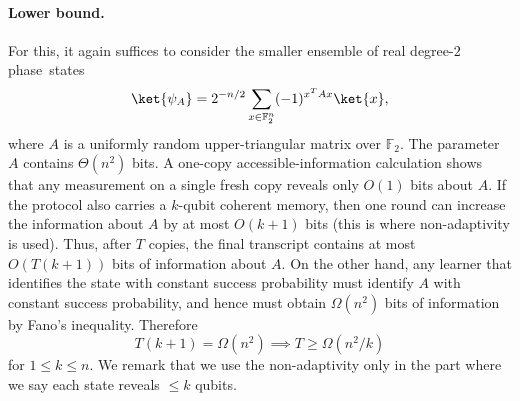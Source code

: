 \documentclass[11pt]{article}
\newcommand{\F}{\mathbb{F}}
\begin{document}
\paragraph{Lower bound.} For this, it again suffices to consider the smaller ensemble of real degree-$2$ phase~states
$$
    \ket{\psi_A}
    =
    2^{-n/2}\sum_{x\in\F_2^n}(-1)^{x^TAx}\ket{x},
$$
where $A$ is a uniformly random upper-triangular matrix over $\F_2$.  The  parameter $A$ contains $\Theta(n^2)$ bits.  A one-copy accessible-information calculation shows that any measurement on a single fresh copy reveals only $O(1)$ bits about $A$.  If the protocol also carries a $k$-qubit coherent memory, then one round can increase the information about $A$ by at most $O(k+1)$ bits (this is where non-adaptivity is used). Thus, after $T$ copies, the final transcript contains at most $O(T(k+1))$ bits of information about $A$.  On the other hand, any learner that identifies the state with constant success probability must identify $A$ with constant success
probability, and hence must obtain $\Omega(n^2)$ bits of information by Fano's inequality.  Therefore
$$
    T(k+1)=\Omega(n^2) \implies T\geq \Omega(n^2/k)
$$
for $1\le k\le n$. We remark that we use the non-adaptivity only in the part where we say each state reveals $\leq k$ qubits.
\end{document}
